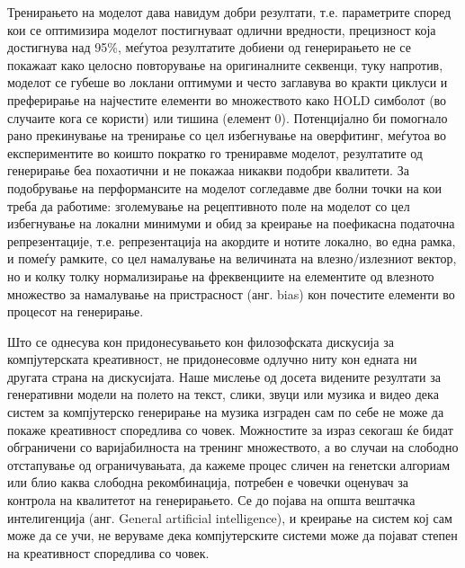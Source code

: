 Тренирањето на моделот дава навидум добри резултати, т.е. параметрите според кои се оптимизира моделот постигнуваат одлични вредности, прецизност која достигнува над 95\%, меѓутоа резултатите добиени од генерирањето не се покажаат како целосно повторување на оригиналните секвенци, туку напротив, моделот се губеше во локлани оптимуми и често заглавува во кракти циклуси и преферирање на најчестите елементи во множеството како HOLD симболот (во случаите кога се користи) или тишина (елемент 0). Потенцијално би помогнало рано прекинување на тренирање со цел избегнување на оверфитинг, меѓутоа во експериментите во коишто пократко го трениравме моделот, резултатите од генерирање беа похаотични и не покажаа никакви подобри квалитети. За подобрување на перформансите на моделот согледавме две болни точки на кои треба да работиме: зголемување на рецептивното поле на моделот со цел избегнување на локални минимуми и обид за креирање на поефикасна податочна репрезентације, т.е. репрезентација на акордите и нотите локално, во една рамка, и помеѓу рамките, со цел намалување на величината на влезно/излезниот вектор, но и колку толку нормализирање на фреквенциите на елементите од влезното множество за намалување на пристрасност (анг. bias) кон почестите елементи во процесот на генерирање.

Што се однесува кон придонесувањето кон филозофската дискусија за компјутерската креативност, не придонесовме одлучно ниту кон едната ни другата страна на дискусијата. Наше мислење од досета видените резултати за генеративни модели на полето на текст, слики, звуци или музика и видео дека систем за компјутерско генерирање на музика изграден сам по себе не може да покаже креативност споредлива со човек. Можностите за израз секогаш ќе бидат обграничени со варијабилноста на тренинг множеството, а во случаи на слободно отстапување од ограничувањата, да кажеме процес сличен на генетски алгориам или блио каква слободна рекомбинација, потребен е човечки оценувач за контрола на квалитетот на генерирањето. Се до појава на општа вештачка интелигенција (анг. General artificial intelligence), и креирање на систем кој сам може да се учи, не веруваме дека компјутерските системи може да појават степен на креативност споредлива со човек.

